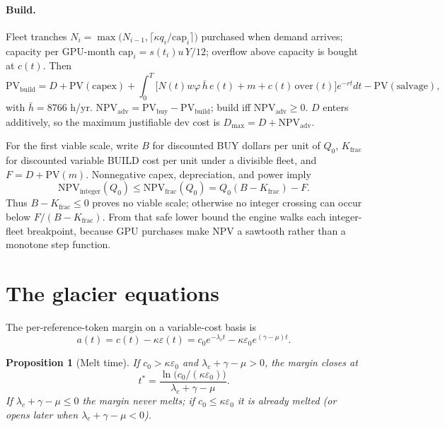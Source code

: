 \documentclass[11pt]{article}
\newtheorem{prop}{Proposition}
\begin{document}
\paragraph{Build.} Fleet tranches $N_i=\max\!\big(N_{i-1},\lceil \kappa q_i/\mathrm{cap}_i\rceil\big)$
purchased when demand arrives; capacity per GPU-month $\mathrm{cap}_i = s(t_i)u\,Y/12$;
overflow above capacity is bought at $c(t)$. Then
\begin{equation}
\mathrm{PV}_{\mathrm{build}} = D+\mathrm{PV}(\mathrm{capex})
+\int_0^T\!\Big[N(t)w\varphi\,\bar h\,e(t)+m+c(t)\,\mathrm{over}(t)\Big]e^{-rt}dt
-\mathrm{PV}(\mathrm{salvage}),
\end{equation}
with $\bar h=8766$ h/yr. $\mathrm{NPV_{adv}}=\mathrm{PV_{buy}}-\mathrm{PV_{build}}$;
build iff $\mathrm{NPV_{adv}}\ge0$. $D$ enters additively, so the maximum justifiable dev
cost is $D_{\max}=D+\mathrm{NPV_{adv}}$.

For the first viable scale, write $B$ for discounted BUY dollars per unit of $Q_0$,
$K_{\mathrm{frac}}$ for discounted variable BUILD cost per unit under a divisible fleet,
and $F=D+\mathrm{PV}(m)$. Nonnegative capex, depreciation, and power imply
\begin{equation}
\mathrm{NPV}_{\mathrm{integer}}(Q_0)\le
\mathrm{NPV}_{\mathrm{frac}}(Q_0)=Q_0(B-K_{\mathrm{frac}})-F.
\end{equation}
Thus $B-K_{\mathrm{frac}}\le0$ proves no viable scale; otherwise no integer crossing can
occur below $F/(B-K_{\mathrm{frac}})$. From that safe lower bound the engine walks each
integer-fleet breakpoint, because GPU purchases make NPV a sawtooth rather than a monotone
step function.

\section{The glacier equations}
The per-reference-token margin on a variable-cost basis is
\begin{equation}
a(t)=c(t)-\kappa\varepsilon(t)=c_0e^{-\lambda_c t}-\kappa\varepsilon_0e^{(\gamma-\mu)t}.
\end{equation}

\begin{prop}[Melt time]
If $c_0>\kappa\varepsilon_0$ and $\lambda_c+\gamma-\mu>0$, the margin closes at
\begin{equation}
t^\ast=\frac{\ln\!\big(c_0/(\kappa\varepsilon_0)\big)}{\lambda_c+\gamma-\mu}.
\end{equation}
If $\lambda_c+\gamma-\mu\le0$ the margin never melts; if $c_0\le\kappa\varepsilon_0$ it is
already melted (or opens later when $\lambda_c+\gamma-\mu<0$).
\end{prop}
\end{document}
